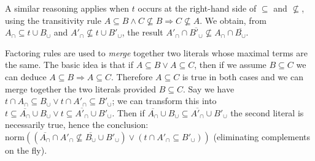 \documentclass{article}
\newcommand{\compl}[1]{\ensuremath{\overline{#1}}}
\newcommand{\normalize}[1]{\ensuremath{\text{norm}(#1)}}
\begin{document}
A similar reasoning applies when $t$ occurs at the right-hand side of
$\subseteq$ and $\not\subseteq$, using the transitivity rule
$A \subseteq B \land C \not\subseteq B \Rightarrow C \not\subseteq A$. We
obtain, from $A_\cap \subseteq t\cup B_\cup$ and
$A'_\cap \not\subseteq t\cup B'_\cup$, the result
$A'_\cap \cap \compl{B'_\cup} \not\subseteq A_\cap \cap \compl{B_\cup}$.

Factoring rules are used to \emph{merge} together two literals whose maximal
terms are the same. The basic idea is that if $A \subseteq B
\lor A \subseteq C$, then if we assume $B\subseteq C$ we can deduce
$A \subseteq B \Rightarrow A \subseteq C$. Therefore $A\subseteq C$ is true
in both cases and we can merge together the two literals provided $B\subseteq C$.
Say we have
$t \cap A_\cap \subseteq B_\cup \lor t \cap A'_\cap \subseteq B'_\cup$; we
can transform this into
$t \subseteq \compl{A_\cap} \cup B_\cup \lor t \subseteq \compl{A'_\cap} \cup B'_\cup$.
Then if $\compl{A_\cap} \cup B_\cup \subseteq \compl{A'_\cap} \cup B'_\cup$
the second literal is necessarily true, hence the conclusion:
$\normalize{(\compl{A_\cap} \cap A'_\cap \not\subseteq \compl{B_\cup} \cup B'_\cup) 
    \lor (t \cap A'_\cap \subseteq B'_\cup)}$ (eliminating complements
on the fly).
\end{document}
